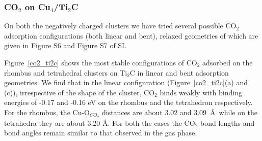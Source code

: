   




  

\subsubsection{CO\texorpdfstring{$_2$}{} on Cu\texorpdfstring{$_4$}{}/Ti\texorpdfstring{$_2$}{}C}

On both the negatively charged clusters we have tried several possible 
CO$_2$ adsorption configurations (both linear and bent), relaxed geometries of which are given in 
Figure S6  and Figure S7 of SI. 

Figure~\ref{co2_ti2c} shows the most stable configurations of CO$_2$
adsorbed on the rhombus and tetrahedral clusters on Ti$_2$C in linear and bent adsorption
geometries. We find that in the linear configuration (Figure~\ref{co2_ti2c}(a) and (c)), irrespective of the shape of the cluster, CO$_2$ binds weakly with binding energies of -0.17 and -0.16 eV on the rhombus and the tetrahedron respectively. For the rhombus, the Cu-O$_{CO_2}$ distances are about 3.02 and 3.09~\AA~while on the tetrahedra they are about 3.20 \AA. For both the cases the CO$_2$ bond lengths and bond angles remain similar to that 
observed in the gas phase.


